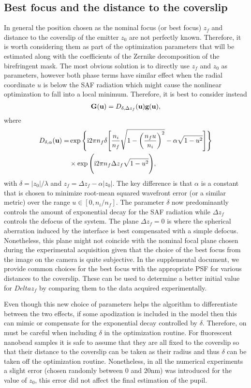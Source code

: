 \documentclass[reprint,aps,pra,superscriptaddress,
amsmath,amssymb]{revtex4-1}
\begin{document}
\subsection{Best focus and the distance to the coverslip}

In general the position chosen as the nominal focus (or best focus) $z_f$ and 
distance to the coverslip of the emitter $z_0$ are not perfectly 
known. Therefore,
it is worth considering them as part of the optimization parameters that 
will be estimated along with the coefficients of the Zernike decomposition 
of the birefringent mask. The most obvious solution is to directly 
use $z_f$ and $z_0$ as parameters, however both phase 
terms have similar effect when the 
radial coordinate $u$ is below the SAF radiation which might cause the 
nonlinear optimization to fall into a local minimum.
Therefore, it is best to 
consider instead
\begin{align}
\textbf G (\textbf u)  = D_{\delta, \Delta z_f} (\textbf u) \textbf g(\textbf u),
\end{align}
where
\begin{align}
D_{\delta, \alpha} (\textbf u)= & \exp \Bigg\{ 
  \text{i} 2 \pi n_f  \delta \Bigg[ \frac{n_i}{n_f} 
  \sqrt{1 - \left(\frac{n_f u}{n_i} \right)^2 }
- \alpha \sqrt{1 - u^2} \Bigg]\Bigg\} \\
& \times \exp \Bigg(
  \text{i} 2 \pi n_f \Delta z_f \sqrt{1 - u^2} \Bigg) , 
\end{align}
with $\delta = |z_0| / \lambda$ and $z_f =\Delta z_f -\alpha |z_0|$. 
The key difference is that $\alpha$ is a constant that is chosen to minimize 
root-mean squared wavefront error (or a similar metric)
over the range $u \in [0, n_i/n_f]$. 
The parameter $\delta$ now predominantly controls the amount of exponential 
decay for the SAF radiation while $\Delta z_f$ controls the defocus of the system.
The plane $\Delta z_f =0$ is where the spherical aberration induced by the 
interface is best compensated with a simple defocus. Nonetheless, this plane 
might not coincide with the nominal focal plane chosen during the experimental 
acquisition given that the choice of the best focus from the image on the camera is 
quite subjective. In the supplemental document, we provide common choices
for the best focus with the appropriate PSF for various distances to the coverslip.
These can be used to determine a better initial value for $Delta z_f$ by 
comparing them to the data acquired experimentally. 

Even though this new choice of parameters helps the algorithm to differentiate 
between the two effects, if some apodization is included in the model then this 
can mimic or compensate for the exponential decay controlled by $\delta$. 
Therefore, on must be careful when including $\delta$ in the optimization 
routine. For fluorescent nanobead samples it is safe to 
assume that they are all fixed to the coverslip so that their distance to the 
coverslip can be taken as their radius and thus $\delta$ can be taken off 
the optimization routine. Nonetheless, in all the numerical experiments a 
slight error (chosen randomly between $0$ and $20$nm) was introduced 
for the value of $z_0$, this error  did not affect the final estimation
of the pupil.
\end{document}
